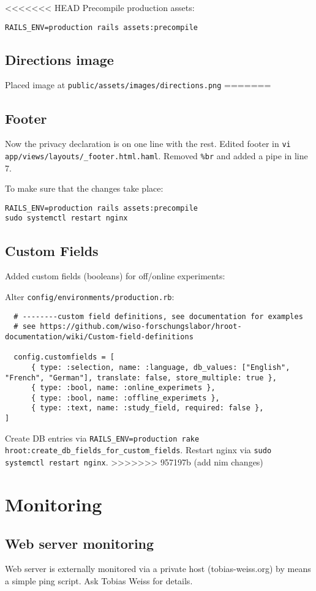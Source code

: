 \documentclass{article}
\begin{document}
<<<<<<< HEAD
Precompile production assets:
\begin{lstlisting}
RAILS_ENV=production rails assets:precompile
\end{lstlisting}


\subsection{Directions image}
Placed image at \verb|public/assets/images/directions.png|
=======
\subsection{Footer}
Now the privacy declaration is on one line with the rest.
Edited footer in \verb|vi app/views/layouts/_footer.html.haml|.
Removed \verb|%br| and added a pipe in line 7.

To make sure that the changes take place:
\begin{lstlisting}
RAILS_ENV=production rails assets:precompile
sudo systemctl restart nginx
\end{lstlisting}

\subsection{Custom Fields}
Added custom fields (booleans) for off/online experiments:

Alter \verb|config/environments/production.rb|:
\begin{lstlisting}
  # --------custom field definitions, see documentation for examples
  # see https://github.com/wiso-forschungslabor/hroot-documentation/wiki/Custom-field-definitions

  config.customfields = [
      { type: :selection, name: :language, db_values: ["English", "French", "German"], translate: false, store_multiple: true },
      { type: :bool, name: :online_experimets }, 
      { type: :bool, name: :offline_experimets },
      { type: :text, name: :study_field, required: false },
]
\end{lstlisting}

Create DB entries via \verb|RAILS_ENV=production rake hroot:create_db_fields_for_custom_fields|.
Restart nginx via \verb|sudo systemctl restart nginx|.
>>>>>>> 957197b (add nim changes)

\section{Monitoring}
\subsection{Web server monitoring}
Web server is externally monitored via a private host (tobias-weiss.org) by means a simple ping script.
Ask Tobias Weiss for details.
\end{document}
